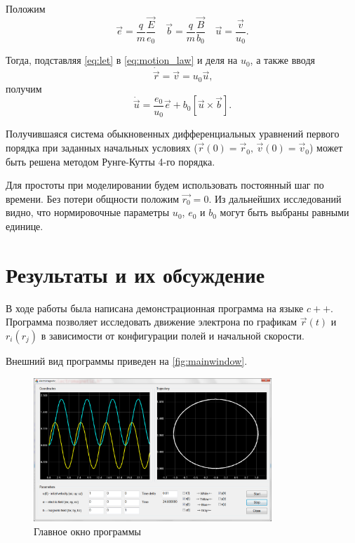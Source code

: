 \documentclass[12pt,a4paper]{article}
\begin{document}
Положим
\begin{equation} \label{eq:let}
\vec{e} = \frac{q}{m} \frac{\vec{E}}{e_0}       \quad %
\vec{b} = \frac{q}{m} \frac{\vec{B}}{b_0}       \quad %
\vec{u} = \frac{\vec{v}}{u_0}                   \textrm{.}
\end{equation}

Тогда, подставляя \autoref{eq:let} в \autoref{eq:motion_law} и деля на $u_0$, а также вводя
\begin{equation}
\dot{\vec{r}} = \vec{v} = u_0 \vec{u} \textrm{,}
\end{equation}
получим
\begin{equation}
\dot{\vec{u}} = \frac{e_0}{u_0} \vec{e} + b_0 \left[\vec{u} \times \vec{b}\right] \textrm{.}
\end{equation}

Получившаяся система обыкновенных дифференциальных уравнений первого порядка при заданных начальных условиях ($\vec{r}(0) = \vec{r}_0 \textrm{, } \vec{v}(0) = \vec{v}_0$) может быть решена методом Рунге-Кутты 4-го порядка.

Для простоты при моделировании будем использовать постоянный шаг по времени. Без потери общности положим $\vec{r_0} = 0$. Из дальнейших исследований видно, что нормировочные параметры $u_0$, $e_0$ и $b_0$ могут быть выбраны равными единице.

\section{Результаты и их обсуждение}

В ходе работы была написана демонстрационная программа на языке $c++$. Программа позволяет исследовать движение электрона по графикам $\vec{r}(t)$ и $r_i(r_j)$ в зависимости от конфигурации полей и начальной скорости.

Внешний вид программы приведен на \autoref{fig:mainwindow}.

\begin{figure}[h]%
\centering
\includegraphics[width=0.8\textwidth]{mainwindow}%
\caption[Главное окно программы.]{Главное окно программы}%
\label{fig:mainwindow}%
\end{figure}
\end{document}
